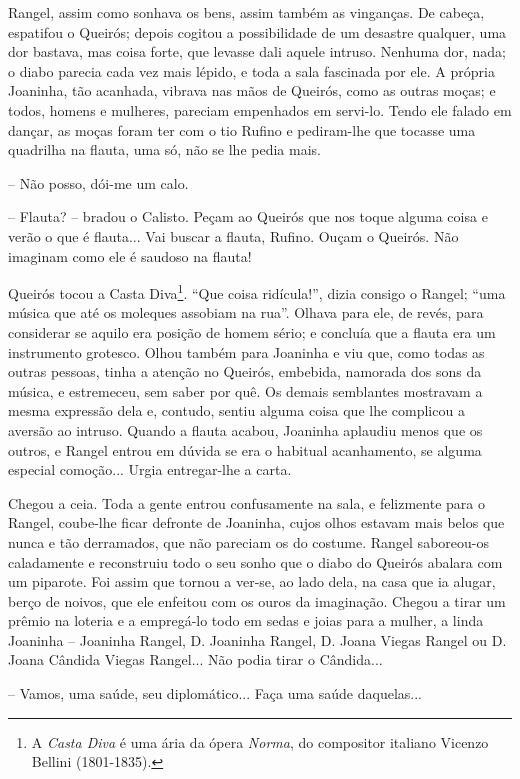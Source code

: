 Rangel, assim como sonhava os bens, assim também as vinganças. De
cabeça, espatifou o Queirós; depois cogitou a possibilidade de um
desastre qualquer, uma dor bastava, mas coisa forte, que levasse dali
aquele intruso. Nenhuma dor, nada; o diabo parecia cada vez mais lépido,
e toda a sala fascinada por ele. A própria Joaninha, tão acanhada,
vibrava nas mãos de Queirós, como as outras moças; e todos, homens e
mulheres, pareciam empenhados em servi-lo. Tendo ele falado em dançar,
as moças foram ter com o tio Rufino e pediram-lhe que tocasse uma
quadrilha na flauta, uma só, não se lhe pedia mais.

-- Não posso, dói-me um calo.

-- Flauta? -- bradou o Calisto. Peçam ao Queirós que nos toque alguma
coisa e verão o que é flauta... Vai buscar a flauta, Rufino. Ouçam o
Queirós. Não imaginam como ele é saudoso na flauta!

Queirós tocou a Casta Diva\footnote{A \emph{Casta Diva} é uma ária da
  ópera \emph{Norma}, do compositor italiano Vicenzo Bellini
  (1801-1835).}. ``Que coisa ridícula!'', dizia consigo o Rangel; ``uma
música que até os moleques assobiam na rua''. Olhava para ele, de revés,
para considerar se aquilo era posição de homem sério; e concluía que a
flauta era um instrumento grotesco. Olhou também para Joaninha e viu
que, como todas as outras pessoas, tinha a atenção no Queirós, embebida,
namorada dos sons da música, e estremeceu, sem saber por quê. Os demais
semblantes mostravam a mesma expressão dela e, contudo, sentiu alguma
coisa que lhe complicou a aversão ao intruso. Quando a flauta acabou,
Joaninha aplaudiu menos que os outros, e Rangel entrou em dúvida se era
o habitual acanhamento, se alguma especial comoção... Urgia entregar-lhe
a carta.

Chegou a ceia. Toda a gente entrou confusamente na sala, e felizmente
para o Rangel, coube-lhe ficar defronte de Joaninha, cujos olhos estavam
mais belos que nunca e tão derramados, que não pareciam os do costume.
Rangel saboreou-os caladamente e reconstruiu todo o seu sonho que o
diabo do Queirós abalara com um piparote. Foi assim que tornou a ver-se,
ao lado dela, na casa que ia alugar, berço de noivos, que ele enfeitou
com os ouros da imaginação. Chegou a tirar um prêmio na loteria e a
empregá-lo todo em sedas e joias para a mulher, a linda Joaninha --
Joaninha Rangel, D. Joaninha Rangel, D. Joana Viegas Rangel ou D. Joana
Cândida Viegas Rangel... Não podia tirar o Cândida...

-- Vamos, uma saúde, seu diplomático... Faça uma saúde daquelas...

